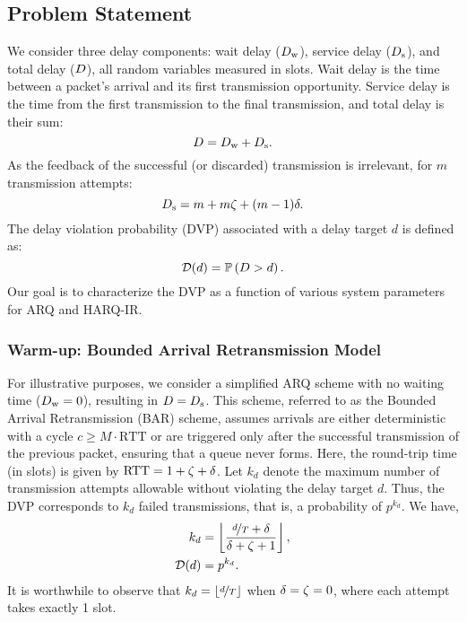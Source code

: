 \subsection{Problem Statement}
We consider three delay components: wait delay ($D_{\mathrm{w}}$), service delay ($D_{\mathrm{s}}$), and total delay ($D$), all random variables measured in slots. Wait delay is the time between a packet’s arrival and its first transmission opportunity. Service delay is the time from the first transmission to the final transmission, and total delay is their sum:
\begin{equation*}
    D = D_{\mathrm{w}}+D_{\mathrm{s}}.
\end{equation*}
As the feedback of the successful (or discarded) transmission is irrelevant, for $m$ transmission attempts:
\begin{equation}
    D_{\mathrm{s}} = m+m{\zeta}+(m-1)\delta.\label{eq:SecModel_Dserv}
\end{equation}
The delay violation probability (DVP) associated with a delay target $d$ is defined as:
\begin{equation}
\mathcal{D}(d) = \mathbb{P}\left(D>d\right).\label{eq:SecModel_dvpDefinition}
\end{equation}
Our goal is to characterize the DVP as a function of various system parameters for ARQ and HARQ-IR. 

\subsubsection{Warm-up: Bounded Arrival Retransmission Model}
For illustrative purposes, we consider a simplified ARQ scheme with no waiting time ($D_{\mathrm{w}} = 0$), resulting in $D = D_{\mathrm{s}}$. 
This scheme, referred to as the Bounded Arrival Retransmission (BAR) scheme, assumes arrivals are either deterministic with a cycle $c\geq M \cdot \text{RTT}$ or are triggered only after the successful transmission of the previous packet, ensuring that a queue never forms. 
Here, the round-trip time (in slots) is given by $\text{RTT}=1+{\zeta}+\delta$. 
Let $k_d$ denote the maximum number of transmission attempts allowable without violating the delay target $d$. Thus, the DVP corresponds to $k_d$ failed transmissions, that is, a probability of $p^{k_d}$. 
We have,
\begin{align}
    k_d &= \left\lfloor \frac{\nicefrac{d}{T} + \delta}{\delta + {\zeta} + 1} \right\rfloor, \label{eq:secModel_Kd} \\
    \mathcal{D}(d) &= p^{k_d}. \label{eq:secModel_BARdvp}
\end{align}
It is worthwhile to observe that $k_d = \left\lfloor \nicefrac{d}{T} \right\rfloor$ when $\delta = {\zeta} = 0$, where each attempt takes exactly 1 slot.\\

